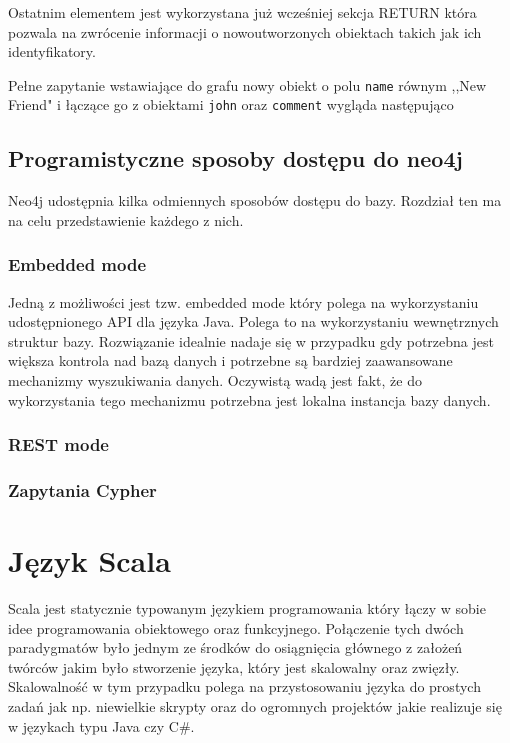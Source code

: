 \documentclass[brudnopis]{xmgr}
\begin{document}


Ostatnim elementem jest wykorzystana już wcześniej sekcja RETURN która pozwala na zwrócenie informacji o nowoutworzonych obiektach takich jak ich identyfikatory.



Pełne zapytanie wstawiające do grafu nowy obiekt o polu \texttt{name} równym ,,New Friend" i łączące go z obiektami \texttt{john} oraz \texttt{comment} wygląda następująco



\section{Programistyczne sposoby dostępu do neo4j}

Neo4j udostępnia kilka odmiennych sposobów dostępu do bazy. Rozdział ten ma na celu przedstawienie każdego z nich.

\subsection{Embedded mode}

Jedną z możliwości jest tzw. embedded mode który polega na wykorzystaniu udostępnionego API dla języka Java. Polega to na wykorzystaniu wewnętrznych struktur bazy. Rozwiązanie idealnie nadaje się w przypadku gdy potrzebna jest większa kontrola nad bazą danych i potrzebne są bardziej zaawansowane mechanizmy wyszukiwania danych. Oczywistą wadą jest fakt, że do wykorzystania tego mechanizmu potrzebna jest lokalna instancja bazy danych.

\subsection{REST mode}

\subsection{Zapytania Cypher}

\chapter{Język Scala}

Scala jest statycznie typowanym językiem programowania który łączy w sobie idee programowania obiektowego oraz funkcyjnego. Połączenie tych dwóch paradygmatów było jednym ze środków do osiągnięcia głównego z założeń twórców jakim było stworzenie języka, który jest skalowalny oraz zwięzły. Skalowalność w tym przypadku polega na przystosowaniu języka do prostych zadań jak np. niewielkie skrypty oraz do ogromnych projektów jakie realizuje się w językach typu Java czy C\#.
\end{document}
